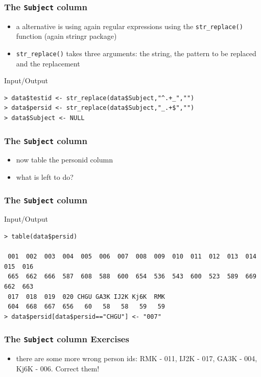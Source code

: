 \documentclass[xcolor={table},c]{beamer}
\begin{document}
\begin{frame}[fragile]\frametitle{The \texttt{Subject} column}
  \begin{itemize}
  \item a alternative is using again regular expressions using the \texttt{str\_replace()} function (again stringr package)
  \item \texttt{str\_replace()} takes three arguments: the string, the pattern to be replaced and the replacement
  \end{itemize}
\begin{exampleblock}{Input/Output}\small
\begin{verbatim}
> data$testid <- str_replace(data$Subject,"^.+_","")
> data$persid <- str_replace(data$Subject,"_.+$","")
> data$Subject <- NULL
\end{verbatim}
\end{exampleblock}
\end{frame}


\begin{frame}[fragile]\frametitle{The \texttt{Subject} column}
  \begin{itemize}
  \item now table the personid column
  \item what is left to do?
  \end{itemize}
\end{frame}

\begin{frame}[fragile]\frametitle{The \texttt{Subject} column}
\begin{exampleblock}{Input/Output}\tiny
\begin{verbatim}
> table(data$persid)

 001  002  003  004  005  006  007  008  009  010  011  012  013  014  015  016 
 665  662  666  587  608  588  600  654  536  543  600  523  589  669  662  663 
 017  018  019  020 CHGU GA3K IJ2K Kj6K  RMK 
 604  668  667  656   60   58   58   59   59 
> data$persid[data$persid=="CHGU"] <- "007"
\end{verbatim}
    \end{exampleblock}
\end{frame}



\begin{frame}[fragile]\frametitle{The \texttt{Subject} column Exercises}
  \begin{itemize}
  \item there are some more wrong person ids: RMK - 011, IJ2K - 017, GA3K - 004, Kj6K - 006. Correct them!
  \end{itemize}
\end{frame}
\end{document}
